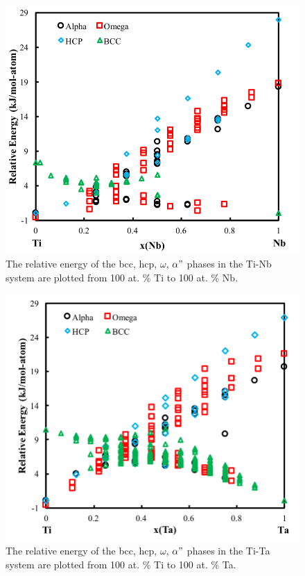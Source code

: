 \pagebreak
\begin{figure}[H]
	\centering
	\includegraphics[width=\textwidth]{Chapter-7/Figures/tinb0k.png}
	\caption{The relative energy of the bcc, hcp, $\omega$, $\alpha"$ phases in the Ti-Nb system are plotted from 100 at. \% Ti to 100 at. \% Nb.}
	\label{Ch7-figure:tinb0K}
\end{figure}

\pagebreak
\begin{figure}[H]
	\centering
	\includegraphics[width=\textwidth]{Chapter-7/Figures/tita0k.png}
	\caption{The relative energy of the bcc, hcp, $\omega$, $\alpha"$ phases in the Ti-Ta system are plotted from 100 at. \% Ti to 100 at. \% Ta.}
	\label{Ch7-figure:titab0K}
\end{figure}

